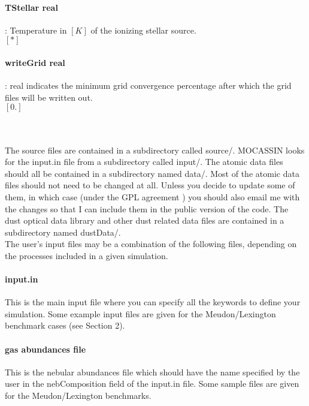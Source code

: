 \documentclass[11pt]{article}
\begin{document}
\paragraph  {  TStellar real  }  : Temperature in $[K]$ of the ionizing stellar source.\\
		     $[*]$\\

\paragraph  {  writeGrid real  } : real indicates the minimum grid convergence percentage
                     after which the grid files will be written out. \\
		     $[0.]$\\

\pagebreak

\\

\\

    The source files are contained in a subdirectory called source/.
    MOCASSIN looks for the input.in file from a subdirectory called input/. 
    The atomic data files should all be contained in a subdirectory named data/. 
    Most of the atomic data files should not need 
    to be changed at all. Unless you decide to update some of them, in which case 
    (under the GPL agreement ) you should also email me with the changes so that 
    I can include them in the public version of the code. 
    The dust optical data library and other dust related data files are contained 
    in a subdirectory named dustData/.\\

    The user's input files may be a combination of the following files, 
    depending on the processes included in a given simulation.\\

\paragraph{    input.in }
    This is the main input file where you can specify all the keywords to define
    your simulation. Some example input files are given for the Meudon/Lexington
    benchmark cases (see Section 2).  

\paragraph{     gas abundances file}
    This is the nebular abundances file which should have the name specified by
    the user in the nebComposition field of the input.in file. Some sample files 
    are given for the Meudon/Lexington benchmarks.
    
\end{document}
